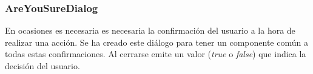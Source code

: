 \subsubsection{AreYouSureDialog}


En ocasiones es necesaria es necesaria la confirmación del usuario a la hora de realizar una acción. Se ha creado este  diálogo para tener un componente común a todas estas confirmaciones. Al cerrarse emite un valor (\textit{true} o \textit{false}) que indica la decisión del usuario.


